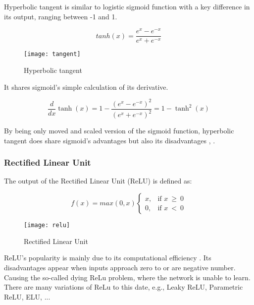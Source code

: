Hyperbolic tangent is similar to logistic sigmoid function with a key difference in its output, ranging between -1 and 1.

\begin{equation}
    {tanh(x) = \frac{e^x - e^{-x}}{e^x + e^{-x}}}
\end{equation}


\begin{figure}[h]
	\centering
    \texttt{[image: tangent]}
	\caption{Hyperbolic tangent \cite{matous}}
	\label{fig:hyperbolictangent}
\end{figure}


It shares sigmoid's simple calculation of its derivative.

\begin{equation}
    {\frac{d}{dx}\tanh(x) = 1 - \frac{(e^x - e^{-x})^2}{(e^x + e^{-x})^2} = 1 -\tanh^2(x)}
\end{equation}

By being only moved and scaled version of the sigmoid function, hyperbolic tangent does share sigmoid's advantages but also its disadvantages \cite{leskovec2020mining}, \cite{matous}.


\subsubsection{Rectified Linear Unit}

The output of the Rectified Linear Unit (ReLU) is defined as:

\begin{equation}
    f(x) = max(0,x)
\begin{cases}
    x, & \text{if $x\ \geq\ 0$}\\
    0, & \text{if $x\ <\ 0$}
\end{cases} 
\end{equation} 

\begin{figure}[h]
	\centering
    \texttt{[image: relu]}
	\caption{Rectified Linear Unit \cite{matous}}
	\label{fig:relu}
\end{figure}


ReLU's popularity is mainly due to its computational efficiency \cite{7typesactivationfunctions}. Its disadvantages appear when inputs approach zero to or are negative number. Causing the so-called dying ReLu problem, where the network is unable to learn. There are many variations of ReLu to this date, e.g., Leaky ReLU, Parametric ReLU, ELU, ...

